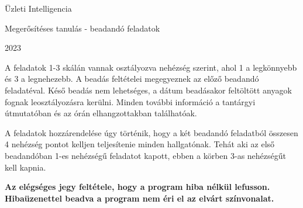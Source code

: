 \documentclass[english]{article}
\begin{document}
\begin{titlepage}
\centering

\vspace{4cm} 

\Huge

Üzleti Intelligencia

\vspace{2cm} 

\Large

Megerősítéses tanulás - beadandó feladatok

\vspace{0.5cm}

2023 %

\vspace{2cm} 

\normalsize

A feladatok 1-3 skálán vannak osztályozva nehézség szerint, ahol 1 a legkönnyebb és 3 a legnehezebb. A beadás feltételei megegyeznek az előző beadandó feladatéval. Késő beadás nem lehetséges, a dátum beadásakor feltöltött anyagok fognak leosztályozásra kerülni. Minden további információ a tantárgyi útmutatóban és az órán elhangzottakban találhatóak.
\par\medskip
A feladatok hozzárendelése úgy történik, hogy a két beadandó feladatból összesen 4 nehézség pontot kelljen teljesítenie minden hallgatónak. Tehát aki az első beadandóban 1-es nehézségű feladatot kapott, ebben a körben 3-as nehézségűt kell kapnia.
\par\medskip
\textbf{Az elégséges jegy feltétele, hogy a program hiba nélkül lefusson. Hibaüzenettel beadva a program nem éri el az elvárt színvonalat.}
\end{titlepage}
\end{document}
